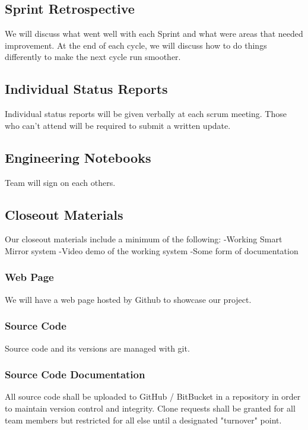 
\subsection{Sprint Retrospective}
We will discuss what went well with each Sprint and what were areas that needed improvement. At the end of each cycle, we will discuss how to do things differently to make the next cycle run smoother.  

\subsection{Individual Status Reports}
Individual status reports will be given verbally at each scrum meeting. Those who can't attend will be required to submit a written update.

\subsection{Engineering Notebooks}
Team will sign on each others.

\subsection{Closeout Materials}
Our closeout materials include a minimum of the following:\newline
-Working Smart Mirror system\newline
-Video demo of the working system\newline
-Some form of documentation\newline

\subsubsection{Web Page}
We will have a web page hosted by Github to showcase our project.

\subsubsection{Source Code}
Source code and its versions are managed with git. 

\subsubsection{Source Code Documentation}
All source code shall be uploaded to GitHub / BitBucket in a repository in order to maintain version control and integrity. Clone requests shall be granted for all team members but restricted for all else until a designated "turnover" point.


